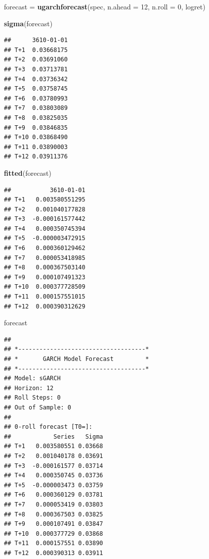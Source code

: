 \documentclass[
]{book}
\newenvironment{Shaded}{\begin{snugshade}}{\end{snugshade}}
\newcommand{\AttributeTok}[1]{\textcolor[rgb]{0.13,0.29,0.53}{#1}}
\newcommand{\DecValTok}[1]{\textcolor[rgb]{0.00,0.00,0.81}{#1}}
\newcommand{\FunctionTok}[1]{\textcolor[rgb]{0.13,0.29,0.53}{\textbf{#1}}}
\newcommand{\NormalTok}[1]{#1}
\newcommand{\OtherTok}[1]{\textcolor[rgb]{0.56,0.35,0.01}{#1}}
\begin{document}
\begin{Shaded}
\begin{Highlighting}[]
\NormalTok{forecast }\OtherTok{=} \FunctionTok{ugarchforecast}\NormalTok{(spec, }\AttributeTok{n.ahead =} \DecValTok{12}\NormalTok{, }\AttributeTok{n.roll =} \DecValTok{0}\NormalTok{, logret)}

\FunctionTok{sigma}\NormalTok{(forecast)}
\end{Highlighting}
\end{Shaded}

\begin{verbatim}
##      3610-01-01
## T+1  0.03668175
## T+2  0.03691060
## T+3  0.03713781
## T+4  0.03736342
## T+5  0.03758745
## T+6  0.03780993
## T+7  0.03803089
## T+8  0.03825035
## T+9  0.03846835
## T+10 0.03868490
## T+11 0.03890003
## T+12 0.03911376
\end{verbatim}

\begin{Shaded}
\begin{Highlighting}[]
\FunctionTok{fitted}\NormalTok{(forecast)}
\end{Highlighting}
\end{Shaded}

\begin{verbatim}
##           3610-01-01
## T+1   0.003580551295
## T+2   0.001040177828
## T+3  -0.000161577442
## T+4   0.000350745394
## T+5  -0.000003472915
## T+6   0.000360129462
## T+7   0.000053418985
## T+8   0.000367503140
## T+9   0.000107491323
## T+10  0.000377728509
## T+11  0.000157551015
## T+12  0.000390312629
\end{verbatim}

\begin{Shaded}
\begin{Highlighting}[]
\NormalTok{forecast}
\end{Highlighting}
\end{Shaded}

\begin{verbatim}
## 
## *------------------------------------*
## *       GARCH Model Forecast         *
## *------------------------------------*
## Model: sGARCH
## Horizon: 12
## Roll Steps: 0
## Out of Sample: 0
## 
## 0-roll forecast [T0=]:
##            Series   Sigma
## T+1   0.003580551 0.03668
## T+2   0.001040178 0.03691
## T+3  -0.000161577 0.03714
## T+4   0.000350745 0.03736
## T+5  -0.000003473 0.03759
## T+6   0.000360129 0.03781
## T+7   0.000053419 0.03803
## T+8   0.000367503 0.03825
## T+9   0.000107491 0.03847
## T+10  0.000377729 0.03868
## T+11  0.000157551 0.03890
## T+12  0.000390313 0.03911
\end{verbatim}
\end{document}
